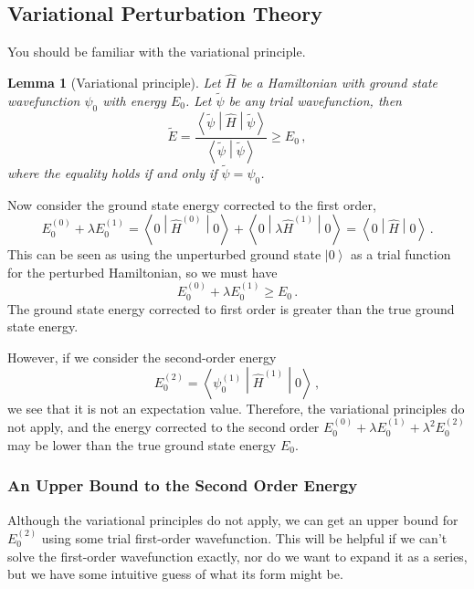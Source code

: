 \documentclass{article}
\theoremstyle{plain}\theoremheaderfont{\normalfont\itshape}\theorembodyfont{\rmfamily}\theoremseparator{.}\newtheorem*{rem}{Remark}\newtheorem*{ex}{Example}\newtheorem*{proof}{Proof}\newtheorem*{altp}{Alternative proof}
\theoremstyle{plain}\theoremheaderfont{\normalfont\bfseries}\theorembodyfont{\rmfamily}\theoremseparator{.}\newtheorem{thm}{Theorem}[section]\newtheorem{lem}[thm]{Lemma}\newtheorem{prop}[thm]{Proposition}\newtheorem*{cor}{Corollary}\newtheorem{defn}[thm]{Definition}\newtheorem{clm}[thm]{Claim}\newtheorem{clminproof}{Claim}
\theoremstyle{break}\theoremheaderfont{\normalfont\itshape}\theorembodyfont{\rmfamily}\theoremseparator{.\medskip}\newtheorem*{proofskip}{Proof}\newtheorem*{exs}{Examples}\newtheorem*{rems}{Remarks}
\theoremstyle{break}\theoremheaderfont{\normalfont\bfseries}\theorembodyfont{\rmfamily}\theoremseparator{.\medskip}\newtheorem{lemskip}[thm]{Lemma}\newtheorem{defnskip}[thm]{Definition}\newtheorem{propskip}[thm]{Proposition}\newtheorem{thmskip}[thm]{Theorem}
\numberwithin{equation}{section}
\newcommand{\ket}[1]{\left| #1 \right\rangle}
\newcommand{\braket}[2]{\left\langle #1 \middle| #2 \right\rangle}
\newcommand{\mel}[3]{\left\langle #1 \middle| #2 \middle| #3 \right\rangle}
\begin{document}
    \subsection{Variational Perturbation Theory}\label{Chap:Variational_Perturbation}
    You should be familiar with the variational principle.
    \begin{lem}[Variational principle]
        Let \(\hat{H}\) be a Hamiltonian with ground state wavefunction \(\psi_0\) with energy \(E_0\). Let \(\tilde{\psi}\) be any trial wavefunction, then
        \begin{equation}
            \tilde{E}=\frac{\mel{\tilde{\psi}}{\hat{H}}{\tilde{\psi}}}{\braket{\tilde{\psi}}{\tilde{\psi}}}\ge E_0\,,
        \end{equation}
        where the equality holds if and only if \(\tilde{\psi}=\psi_0\).
    \end{lem}
    Now consider the ground state energy corrected to the first order,
    \begin{equation}
        E_0^{(0)}+\lambda E_0^{(1)}=\mel{0}{\hat{H}^{(0)}}{0}+\mel{0}{\lambda\hat{H}^{(1)}}{0}=\mel{0}{\hat{H}}{0}\,.
    \end{equation}
    This can be seen as using the unperturbed ground state \(\ket{0}\) as a trial function for the perturbed Hamiltonian, so we must have
    \begin{equation}
        E_0^{(0)}+\lambda E_0^{(1)}\ge E_0\,.
    \end{equation}
    The ground state energy corrected to first order is greater than the true ground state energy.

    However, if we consider the second-order energy
    \begin{equation}
        E_0^{(2)}=\mel{\psi_0^{(1)}}{\hat{H}^{(1)}}{0}\,,
    \end{equation}
    we see that it is not an expectation value. Therefore, the variational principles do not apply, and the energy corrected to the second order \(E_0^{(0)}+\lambda E_0^{(1)}+\lambda^2 E_0^{(2)}\) may be lower than the true ground state energy \(E_0\).

    \subsubsection{An Upper Bound to the Second Order Energy}
    Although the variational principles do not apply, we can get an upper bound for \(E_0^{(2)}\) using some trial first-order wavefunction. This will be helpful if we can't solve the first-order wavefunction exactly, nor do we want to expand it as a series, but we have some intuitive guess of what its form might be.
\end{document}
